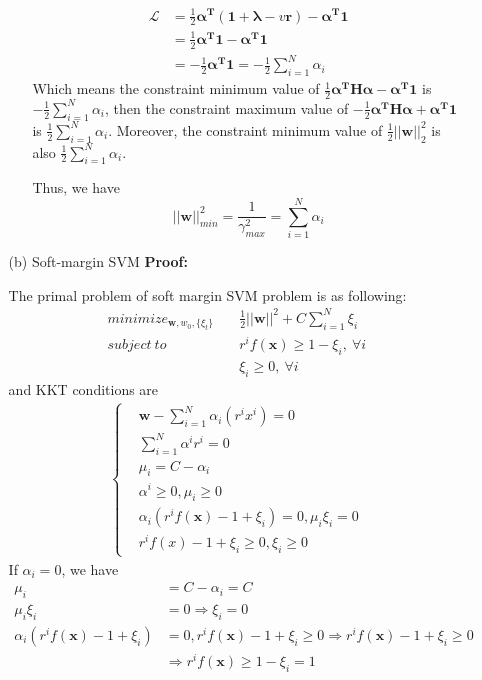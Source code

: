 \documentclass{article}
\renewcommand{\b}[1]{\bm{#1}}
\begin{document}
\begin{enumerate}
\begin{enumerate}
\begin{enumerate}
\begin{align*}
                \mathcal{L} &= \frac{1}{2}\b{\alpha^T}(\b{1+\lambda}-v\b{r})-\b{\alpha^T 1}\\
                &=\frac{1}{2}\b{\alpha^T 1}-\b{\alpha^T 1}\\
                &=-\frac{1}{2}\b{\alpha^T 1}=-\frac{1}{2}\sum_{i=1}^N\alpha_i
            \end{align*}
            Which means the constraint minimum value of $\frac{1}{2}\b{\alpha^T H\alpha}-\b{\alpha^T 1}$ is $-\frac{1}{2}\sum_{i=1}^N\alpha_i$, then the constraint maximum value of $-\frac{1}{2}\b{\alpha^T H\alpha}+\b{\alpha^T 1}$ is $\frac{1}{2}\sum_{i=1}^N\alpha_i$. Moreover, the constraint minimum value of $\frac{1}{2}||\b{w}||_2^2$ is also $\frac{1}{2}\sum_{i=1}^N\alpha_i$.
            \par Thus, we have 
            \[||\b{w}||_{min}^2=\frac{1}{\gamma^2_{max}}=\sum_{i=1}^N\alpha_i\]
        \end{enumerate}
        \item [(b)]Soft-margin SVM\newline
        {\bf Proof:}
        \par The primal problem of soft margin SVM problem is as following:
        \begin{align*}
            minimize_{\b{w},w_0,\{\xi_t\}}\quad & \frac{1}{2}||\b{w}||^2+C\sum_{i=1}^N \xi_i\\
            subject\ to\quad & r^if(\b{x})\geq 1-\xi_i,\ \forall i\\
            & \xi_i\geq 0,\ \forall i
        \end{align*}
        and KKT conditions are
        \begin{align*}
            \left\{\begin{aligned}
                &\b{w}-\sum_{i=1}^N\alpha_i(r^ix^i)=0\\
                &\sum_{i=1}^N\alpha^ir^i=0\\
                &\mu_i=C-\alpha_i\\
                &\alpha^i\geq 0, \mu_i\geq 0\\
                &\alpha_i(r^if(\b{x})-1+\xi_i)=0,\mu_i\xi_i=0\\
                &r^if(x)-1+\xi_i\geq 0,\xi_i\geq 0
            \end{aligned}\right.
        \end{align*}
        If $\alpha_i=0$, we have 
        \begin{align*}
            \mu_i &= C-\alpha_i = C\\
            \mu_i\xi_i&=0\Rightarrow\xi_i=0\\
            \alpha_i(r^if(\b{x})-1+\xi_i)&=0, r^if(\b{x})-1+\xi_i \geq 0 \Rightarrow r^if(\b{x})-1+\xi_i\geq 0\\
            &\Rightarrow r^if(\b{x})\geq 1-\xi_i = 1
        \end{align*}


\end{enumerate}
\end{enumerate}
\end{document}
